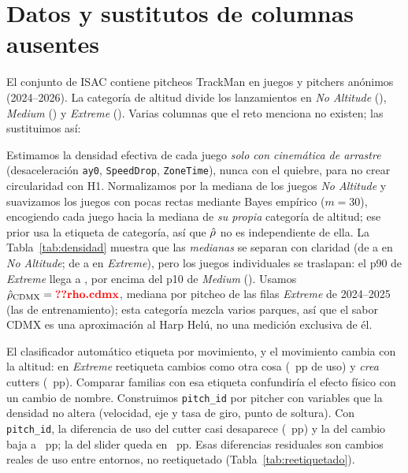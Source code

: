 \documentclass[10pt]{article}
\begin{document}
\section{Datos y sustitutos de columnas ausentes}
\label{sec:datos}

El conjunto de ISAC contiene  pitcheos TrackMan en  juegos y  pitchers anónimos (2024--2026). La categoría de altitud divide los lanzamientos en \emph{No Altitude} (), \emph{Medium} () y \emph{Extreme} (). Varias columnas que el reto menciona no existen; las sustituimos así:

\begin{description}[leftmargin=0pt]
  \item[Altitud y estadio $\to$ densidad continua $\rhohat$.] Estimamos la densidad efectiva de cada juego \emph{solo con cinemática de arrastre} (desaceleración \texttt{ay0}, \texttt{SpeedDrop}, \texttt{ZoneTime}), nunca con el quiebre, para no crear circularidad con H1. Normalizamos por la mediana de los juegos \emph{No Altitude} y suavizamos los juegos con pocas rectas mediante Bayes empírico ($m=30$), encogiendo cada juego hacia la mediana de \emph{su propia} categoría de altitud; ese prior usa la etiqueta de categoría, así que $\rhohat$ no es independiente de ella. La Tabla~\ref{tab:densidad} muestra que las \emph{medianas} se separan con claridad (de  a  en \emph{No Altitude}; de  a  en \emph{Extreme}), pero los juegos individuales se traslapan: el p90 de \emph{Extreme} llega a , por encima del p10 de \emph{Medium} (). Usamos $\rhohat_{\text{CDMX}}=\cf{rho.cdmx}$, mediana por pitcheo de las filas \emph{Extreme} de 2024--2025 (las de entrenamiento); esta categoría mezcla varios parques, así que el sabor CDMX es una aproximación al Harp Helú, no una medición exclusiva de él.
  \item[\texttt{AutoPitchType} $\to$ \texttt{pitch\_id} invariante.] El clasificador automático etiqueta por movimiento, y el movimiento cambia con la altitud: en \emph{Extreme} reetiqueta cambios como otra cosa (~pp de uso) y \emph{crea} cutters (~pp). Comparar familias con esa etiqueta confundiría el efecto físico con un cambio de nombre. Construimos \texttt{pitch\_id} por pitcher con variables que la densidad no altera (velocidad, eje y tasa de giro, punto de soltura). Con \texttt{pitch\_id}, la diferencia de uso del cutter casi desaparece (~pp) y la del cambio baja a ~pp; la del slider queda en ~pp. Esas diferencias residuales son cambios reales de uso entre entornos, no reetiquetado (Tabla~\ref{tab:reetiquetado}).

\end{description}
\end{document}
